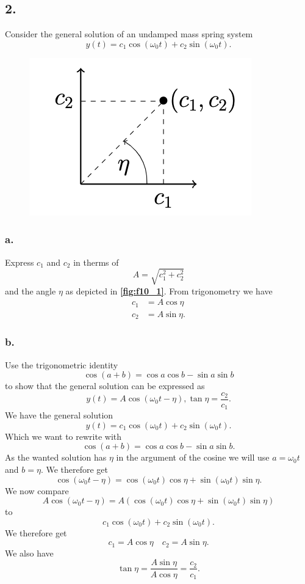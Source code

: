 \subsection*{2.} Consider the general solution of an undamped mass spring system
\[ 
y(t) = c_1 \cos \left( \omega_0 t \right) + c_2 \sin \left( \omega_0 t \right)
.\]

\begin{figure} [ht]
  \centering
  \caption{}
  \includegraphics[width=0.35\linewidth]{../figures/f10_1.png}
  \label{fig:f10_1}
\end{figure}

\subsubsection*{a.} Express $c_1$ and $c_2$ in therms of
\[ 
A = \sqrt{c_1^2 + c_2^2}
\]
and the angle $\eta$ as depicted in \textbf{\autoref{fig:f10_1}}.
\bigbreak
From trigonometry we have
\begin{align*}
  c_1 &= A\cos \eta \\
  c_2 &= A\sin \eta
.\end{align*}



\subsubsection*{b.} Use the trigonometric identity
\[ 
\cos \left( a + b \right) = \cos a \cos b - \sin a \sin b
\]
to show that the general solution can be expressed as
\[ 
y(t) = A \cos \left( \omega_0 t - \eta \right), \tan \eta = \frac{c_2}{c_1}
.\]
\bigbreak
We have the general solution
\[ 
y(t) = c_1 \cos \left( \omega_0 t \right) + c_2 \sin \left( \omega_0 t \right)
.\]
Which we want to rewrite with
\[ 
\cos \left( a + b \right) = \cos a \cos b - \sin a \sin b
.\]
As the wanted solution has $\eta$ in the argument of the cosine we will use $a = \omega_0 t$ and $b = \eta$. We therefore get
\[ 
\cos \left( \omega_0 t - \eta \right) = \cos (\omega_0 t) \cos\eta + \sin \left( \omega_0 t \right) \sin \eta
.\]
We now compare
\[ 
A \cos \left( \omega_0 t - \eta \right) = A \left( \cos \left( \omega_0 t \right) \cos\eta + \sin \left( \omega_0 t \right) \sin \eta \right)
\]
to
\[ 
c_1 \cos (\omega_0 t) + c_2 \sin (\omega_0 t)
.\]
We therefore get
\[ 
  c_1 = A \cos \eta \quad c_2 = A \sin \eta
.\]
We also have
\begin{equation*}
  \tan \eta = \frac{A \sin \eta}{A \cos \eta} = \frac{c_2}{c_1}
.\end{equation*}


